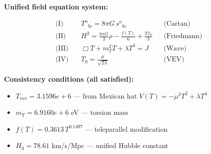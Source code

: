 
\textbf{Unified field equation system:}

\begin{align}
  \text{(I)} \quad & T^a{}_{bc} = 8\pi G \, s^a{}_{bc} && \text{(Cartan)} \\
  \text{(II)} \quad & H^2 = \frac{8\pi G}{3}\rho - \frac{f(T)}{6} + \frac{Tf_T}{3} && \text{(Friedmann)} \\
  \text{(III)} \quad & \Box T + m_T^2 T + \lambda T^3 = J && \text{(Wave)} \\
  \text{(IV)} \quad & T_0 = \frac{\mu}{\sqrt{2\lambda}} && \text{(VEV)}
\end{align}

\textbf{Consistency conditions (all satisfied):}
\begin{itemize}
  \item $T_{\text{vev}} = 3.1596e+6$ — from Mexican hat $V(T) = -\mu^2 T^2 + \lambda T^4$
  \item $m_T = 6.9160e+6$ eV — torsion mass
  \item $f(T) = 0.3613 \, T^{0.1497}$ — teleparallel modification
  \item $H_0 = 78.61$ km/s/Mpc — unified Hubble constant
\end{itemize}